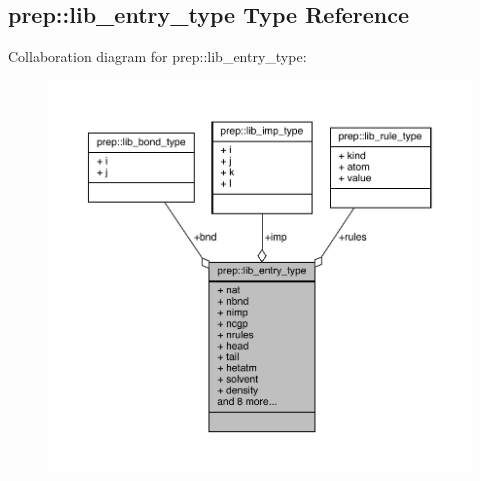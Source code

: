 \hypertarget{structprep_1_1lib__entry__type}{\subsection{prep\-:\-:lib\-\_\-entry\-\_\-type Type Reference}
\label{structprep_1_1lib__entry__type}
}


Collaboration diagram for prep\-:\-:lib\-\_\-entry\-\_\-type\-:
\nopagebreak
\begin{figure}[H]
\begin{center}
\leavevmode
\includegraphics[width=350pt]{structprep_1_1lib__entry__type__coll__graph}
\end{center}
\end{figure}
